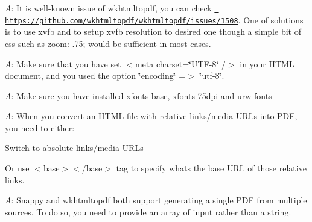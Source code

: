 {\itshape A}\+: It is well-\/known issue of wkhtmltopdf, you can check \href{https://github.com/wkhtmltopdf/wkhtmltopdf/issues/1508}{\texttt{ https\+://github.\+com/wkhtmltopdf/wkhtmltopdf/issues/1508}}. One of solutions is to use xvfb and to setup xvfb resolution to desired one though a simple bit of css such as {\ttfamily zoom\+: .75;} would be sufficient in most cases.


{\itshape A}\+: Make sure that you have set {\ttfamily \texorpdfstring{$<$}{<}meta charset=\char`\"{}\+UTF-\/8\char`\"{} /\texorpdfstring{$>$}{>}} in your HTML document, and you used the option {\ttfamily \char`\"{}encoding\char`\"{} =\texorpdfstring{$>$}{>} \char`\"{}utf-\/8\char`\"{}}.


{\itshape A}\+: Make sure you have installed {\ttfamily xfonts-\/base}, {\ttfamily xfonts-\/75dpi} and {\ttfamily urw-\/fonts}


{\itshape A}\+: When you convert an HTML file with relative links/media URLs into PDF, you need to either\+:
\begin{DoxyItemize}
\item Switch to absolute links/media URLs
\item Or use {\ttfamily \texorpdfstring{$<$}{<}base\texorpdfstring{$>$}{>}\texorpdfstring{$<$}{<}/base\texorpdfstring{$>$}{>}} tag to specify what\textquotesingle{}s the base URL of those relative links.
\end{DoxyItemize}


{\itshape A}\+: Snappy and wkhtmltopdf both support generating a single PDF from multiple sources. To do so, you need to provide an array of input rather than a string.


\begin{DoxyCode}{0}
\DoxyCodeLine{}
\DoxyCodeLine{\textcolor{comment}{// or}}

\end{DoxyCode}


